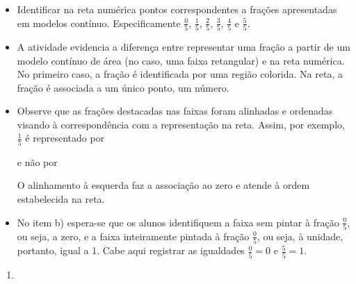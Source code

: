 \begin{atividade}\label{chap3-ativ5}
\objetivos
  \begin{itemize} %
    \item Identificar na reta numérica pontos correspondentes a frações apresentadas em modelos contínuo. Especificamente    $\frac{0}{5}$,  $\frac{1}{5}$,       $\frac{2}{5}$,       $\frac{3}{5}$, $\frac{4}{5}$ e $\frac{5}{5}$.
\end{itemize} %

\discussoes
\begin{itemize} %
    \item A atividade evidencia a diferença entre representar uma fração a partir de um modelo contínuo de área (no caso, uma faixa retangular) e na reta numérica. No primeiro caso, a fração é identificada por uma região colorida. Na reta, a fração é associada a um único ponto, um número.
    \item Observe que as frações destacadas nas faixas foram alinhadas e ordenadas visando à correspondência com a representação na reta.  Assim, por exemplo, $\frac{1}{5}$ é representado por
      e não por       
O alinhamento à esquerda faz a associação ao zero e atende à ordem estabelecida na reta.
\item       No item b) espera-se que os alunos identifiquem a faixa sem pintar à fração $\frac{0}{5}$, ou seja, a zero, e a faixa inteiramente pintada à fração $\frac{0}{5}$, ou seja, à unidade, portanto, igual a 1. Cabe aqui registrar as igualdades $\frac{0}{5}=0$ e $\frac{5}{5}=1$.

\end{itemize} %

\solucao
\begin{enumerate}
\item {}
{
\begin{tikzpicture}[x=56.25mm,y=56.25mm]



\end{tikzpicture}}
\end{enumerate}
\end{atividade}
